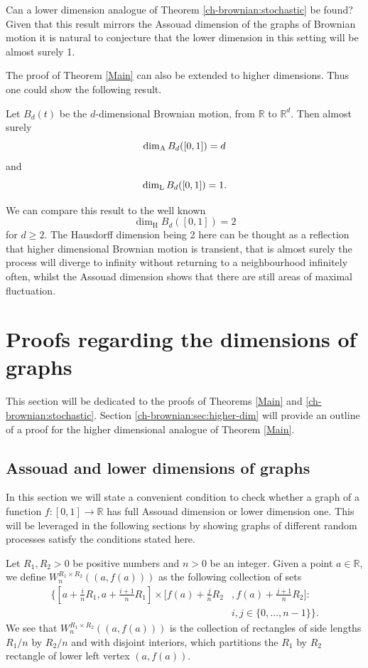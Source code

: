 \begin{question}
Can a lower dimension analogue of Theorem \ref{ch-brownian:stochastic} be found? Given that this result mirrors the Assouad dimension of the graphs of Brownian motion it is natural to conjecture that the lower dimension in this setting will be almost surely 1.
\end{question}


The proof of Theorem \ref{Main} can also be extended to higher dimensions. Thus one could show the following result.

Let $B_d(t)$ be the $d$-dimensional Brownian motion, from $\mathbb{R}$ to $\mathbb{R}^d$. Then almost surely
\[
\dim_{\textup{A}} B_d([0,1])=d
\]
and 
\[
\dim_{\textup{L}} B_d([0,1]) = 1.
\]
	
We can compare this result to the well known \[\dim_{\mathrm{H}} B_d([0,1])=2\] for $d\geq 2$. The Hausdorff dimension being 2 here can be thought as a reflection that higher dimensional Brownian motion is transient, that is almost surely the process will diverge to infinity without returning to a neighbourhood infinitely often, whilst the Assouad dimension shows that there are still areas of maximal fluctuation. 



\section{Proofs regarding the dimensions of graphs}

This section will be dedicated to the proofs of Theorems \ref{Main} and \ref{ch-brownian:stochastic}. Section \ref{ch-brownian:sec:higher-dim} will provide an outline of a proof for the higher dimensional analogue of Theorem \ref{Main}.


\subsection{Assouad and lower dimensions of graphs}\label{ch:brownian:graph-proof}
In this section we will state a convenient condition to check whether a graph of a function $f:[0,1]\to\mathbb{R}$ has full Assouad dimension or lower dimension one. This will be leveraged in the following sections by showing graphs of different random processes satisfy the conditions stated here.


Let $R_1,R_2>0$ be positive numbers and $n>0$ be an integer. Given a point $a\in\mathbb{R}$, we define $W_{n}^{R_1\times R_2}((a, f(a)))$ as the following collection of sets
\begin{align*}
	\Bigg\{\left[a+\frac{i}{n}R_{1}, a+\frac{i+1}{n}R_{1}\right]\times \bigg[f(a)+\frac{j}{n}R_{2}&,f(a)+\frac{j+1}{n}R_{2}\bigg] \colon \\
	    & i,j\in\{0,\dots,n-1\}\Bigg\}.
\end{align*}
We see that $W_{n}^{R_1\times R_2}((a,f(a)))$ is the collection of rectangles of side lengths $R_1/n$ by $R_2/n$ and with disjoint interiors, which partitions the $R_1$ by $R_2$ rectangle of lower left vertex $(a,f(a))$.
	
